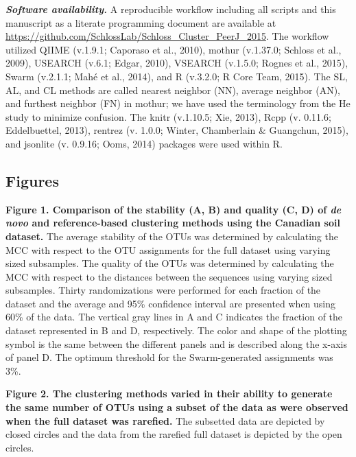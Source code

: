 \documentclass[11pt,]{article}
\begin{document}
\textbf{\emph{Software availability.}} A reproducible workflow including
all scripts and this manuscript as a literate programming document are
available at
\url{https://github.com/SchlossLab/Schloss_Cluster_PeerJ_2015}. The
workflow utilized QIIME (v.1.9.1; Caporaso et al., 2010), mothur
(v.1.37.0; Schloss et al., 2009), USEARCH (v.6.1; Edgar, 2010), VSEARCH
(v.1.5.0; Rognes et al., 2015), Swarm (v.2.1.1; Mahé et al., 2014), and
R (v.3.2.0; R Core Team, 2015). The SL, AL, and CL methods are called
nearest neighbor (NN), average neighbor (AN), and furthest neighbor (FN)
in mothur; we have used the terminology from the He study to minimize
confusion. The knitr (v.1.10.5; Xie, 2013), Rcpp (v. 0.11.6;
Eddelbuettel, 2013), rentrez (v. 1.0.0; Winter, Chamberlain \&
Guangchun, 2015), and jsonlite (v. 0.9.16; Ooms, 2014) packages were
used within R.

\newpage

\subsection{Figures}\label{figures}

\textbf{Figure 1. Comparison of the stability (A, B) and quality (C, D)
of \emph{de novo} and reference-based clustering methods using the
Canadian soil dataset.} The average stability of the OTUs was determined
by calculating the MCC with respect to the OTU assignments for the full
dataset using varying sized subsamples. The quality of the OTUs was
determined by calculating the MCC with respect to the distances between
the sequences using varying sized subsamples. Thirty randomizations were
performed for each fraction of the dataset and the average and 95\%
confidence interval are presented when using 60\% of the data. The
vertical gray lines in A and C indicates the fraction of the dataset
represented in B and D, respectively. The color and shape of the
plotting symbol is the same between the different panels and is
described along the x-axis of panel D. The optimum threshold for the
Swarm-generated assignments was 3\%.

\textbf{Figure 2. The clustering methods varied in their ability to
generate the same number of OTUs using a subset of the data as were
observed when the full dataset was rarefied.} The subsetted data are
depicted by closed circles and the data from the rarefied full dataset
is depicted by the open circles.
\end{document}
